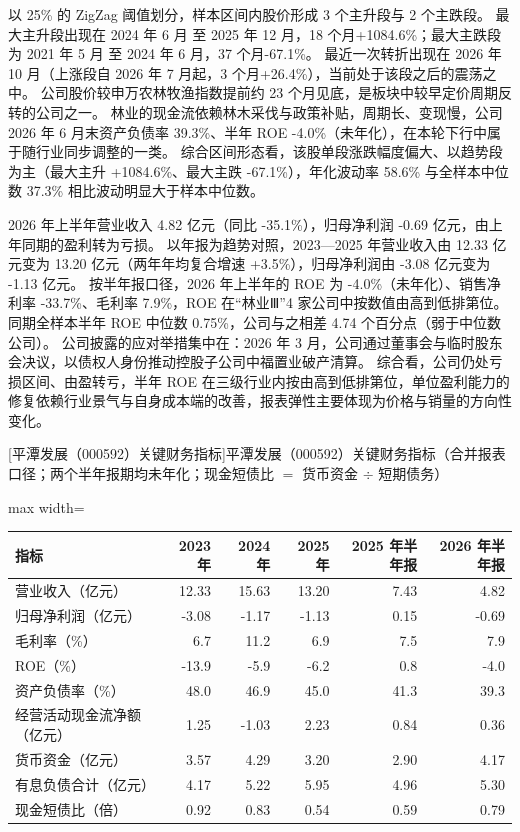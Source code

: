  以 25\% 的 ZigZag 阈值划分，样本区间内股价形成 3 个主升段与 2 个主跌段。 最大主升段出现在 2024 年 6 月 至 2025 年 12 月，18 个月+1084.6\%；最大主跌段为 2021 年 5 月 至 2024 年 6 月，37 个月-67.1\%。 最近一次转折出现在 2026 年 10 月（上涨段自 2026 年 7 月起，3 个月+26.4\%），当前处于该段之后的震荡之中。 公司股价较申万农林牧渔指数提前约 23 个月见底，是板块中较早定价周期反转的公司之一。 林业的现金流依赖林木采伐与政策补贴，周期长、变现慢，公司 2026 年 6 月末资产负债率 39.3\%、半年 ROE -4.0\%（未年化），在本轮下行中属于随行业同步调整的一类。 综合区间形态看，该股单段涨跌幅度偏大、以趋势段为主（最大主升 +1084.6\%、最大主跌 -67.1\%），年化波动率 58.6\% 与全样本中位数 37.3\% 相比波动明显大于样本中位数。

 2026 年上半年营业收入 4.82 亿元（同比 -35.1\%），归母净利润 -0.69 亿元，由上年同期的盈利转为亏损。 以年报为趋势对照，2023---2025 年营业收入由 12.33 亿元变为 13.20 亿元（两年年均复合增速 +3.5\%），归母净利润由 -3.08 亿元变为 -1.13 亿元。 按半年报口径，2026 年上半年的 ROE 为 -4.0\%（未年化）、销售净利率 -33.7\%、毛利率 7.9\%，ROE 在“林业Ⅲ”4 家公司中按数值由高到低排第位。 同期全样本半年 ROE 中位数 0.75\%，公司与之相差 4.74 个百分点（弱于中位数公司）。 公司披露的应对举措集中在：2026 年 3 月，公司通过董事会与临时股东会决议，以债权人身份推动控股子公司中福置业破产清算。 综合看，公司仍处亏损区间、由盈转亏，半年 ROE 在三级行业内按由高到低排第位，单位盈利能力的修复依赖行业景气与自身成本端的改善，报表弹性主要体现为价格与销量的方向性变化。

\begin{center}\small\setlength{\tabcolsep}{3.4pt}
[平潭发展（000592）关键财务指标]{平潭发展（000592）关键财务指标（合并报表口径；两个半年报期均未年化；现金短债比 $=$ 货币资金 $\div$ 短期债务）}
\begin{adjustbox}{max width=\textwidth}
\begin{tabular}{@{}lrrrrr@{}}
\toprule
指标 & 2023 年 & 2024 年 & 2025 年 & 2025 年半年报 & 2026 年半年报 \\
\midrule
营业收入（亿元） & 12.33 & 15.63 & 13.20 & 7.43 & 4.82 \\
归母净利润（亿元） & -3.08 & -1.17 & -1.13 & 0.15 & -0.69 \\
毛利率（\%） & 6.7 & 11.2 & 6.9 & 7.5 & 7.9 \\
ROE（\%） & -13.9 & -5.9 & -6.2 & 0.8 & -4.0 \\
资产负债率（\%） & 48.0 & 46.9 & 45.0 & 41.3 & 39.3 \\
经营活动现金流净额（亿元） & 1.25 & -1.03 & 2.23 & 0.84 & 0.36 \\
货币资金（亿元） & 3.57 & 4.29 & 3.20 & 2.90 & 4.17 \\
有息负债合计（亿元） & 4.17 & 5.22 & 5.95 & 4.96 & 5.30 \\
现金短债比（倍） & 0.92 & 0.83 & 0.54 & 0.59 & 0.79 \\
\bottomrule
\end{tabular}
\end{adjustbox}
\end{center}

